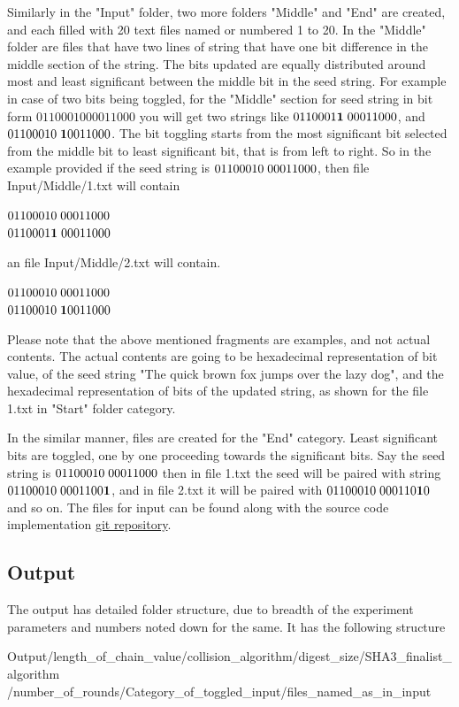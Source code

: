 Similarly in the "Input" folder, two more folders "Middle" and "End" are created, and each filled with 20 text
files named or numbered 1 to 20. In the "Middle" folder are files that have two lines of string that have one
bit difference in the middle section of the string. The bits updated are equally distributed around most and least
significant between the middle bit in the seed string. For example in case of two bits being toggled, for the 
"Middle" section for seed string in bit form $01100010 00011000$ you will get two strings like $0110001{\bf 1}
\thickspace00011000$, and $01100010\thickspace{\bf 1}0011000$. The bit toggling starts from the most significant
bit selected from the middle bit to least significant bit, that is from left to right. So in the example provided
if the seed string is $01100010\thickspace00011000$, then file Input/Middle/1.txt will contain 
\begin{center}$01100010\thickspace00011000$\\
$0110001{\bf 1}\thickspace00011000$\end{center}
an file Input/Middle/2.txt will contain.
\begin{center}$01100010\thickspace00011000$\\
$01100010\thickspace{\bf 1}0011000$\end{center}
Please note that the above mentioned fragments are examples, and not actual contents. The actual contents are going
to be hexadecimal representation of bit value, of the seed string "The quick brown fox jumps over the lazy dog", and 
the hexadecimal representation of bits of the updated string, as shown for the file 1.txt in "Start" folder category.

In the similar manner, files are created for the "End" category. Least significant bits are toggled, one by one
proceeding towards the significant bits. Say the seed string is $01100010\thickspace00011000$ then in file 1.txt 
the seed will be paired with string $01100010\thickspace0001100{\bf 1}$, and in file 2.txt it will be paired with 
$01100010\thickspace000110{\bf 1}0$ and so on. The files for input can be found along with the source code 
implementation \href{"https://github.com/sxs9174/MSProjectCode/tree/master/MSProjectCode/Input"}{git repository}.

\subsection{Output}

The output has detailed folder structure, due to breadth of the experiment parameters and numbers noted down for
the same. It has the following structure
\begin{center}Output/length\_of\_chain\_value/collision\_algorithm/digest\_size/SHA3\_finalist\_algorithm
/number\_of\_rounds/Category\_of\_toggled\_input/files\_named\_as\_in\_input\end{center}

